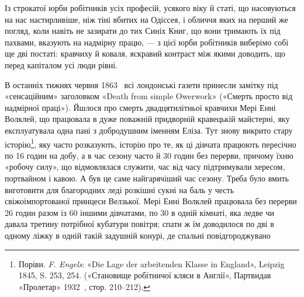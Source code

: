Із строкатої юрби робітників усіх професій, усякого віку й
статі, що насовуються на нас настирливіше, ніж тіні вбитих на
Одіссея, і обличчя яких на перший же погляд, коли навіть не
зазирати до тих Синіх Книг, що вони тримають їх під пахвами,
вказують на надмірну працю, — з цієї юрби робітників виберімо
собі ще дві постаті: кравчиху й коваля, яскравий контраст між
якими доводить, що перед капіталом усі люди рівні.

В останніх тижнях червня 1863~ всі лондонські газети принесли
замітку під «сенсаційним» заголовком «Death from simple
Owerwork» («Смерть просто від надмірної праці»). Йшлося про
смерть двадцятилітньої кравчихи Мері Енні Волклей, що працювала
в дуже поважній придворній кравецькій майстерні, яку експлуатувала
одна пані з добродушним іменням Еліза. Тут знову
викрито стару історію\footnote{
Порівн. \emph{F. Engels}: «Die Lage der arbeitenden Klasse in England»,
Leipzig 1845, S. 253, 254. («Становище робітничої кляси в Англії»,
Партвидав «Пролетар» 1932~, стор. 210--212).
}, яку часто розказують, історію про те,
як ці дівчата працюють пересічно по 16 годин на добу, а в час
сезону часто й 30 годин без перерви, причому їхню «робочу силу»,
що відмовлялася служити, час від часу підтримували хересом,
портвайном і кавою. А був це саме найгарячіший час сезону. Треба
було вмить виготовити для благородних леді розкішні сукні на
баль у честь свіжоімпортованої принцеси Велзької. Мері Енні
Волклей працювала без перерви 26 годин разом із 60 іншими
дівчатами, по 30 в одній кімнаті, яка ледве чи давала третину
потрібної кубатури повітря; спати ж їм доводилося по дві в одному
ліжку в одній такій задушній конурі, де спальні повідгороджувано
